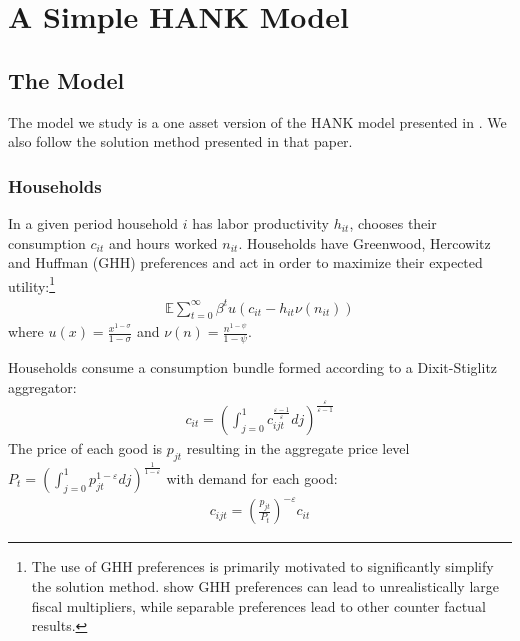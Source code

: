 \documentclass[titlepage]{\econtex}\newcommand{\texname}{ConsumptionHeterogeneity}
\begin{document}
\section{A Simple HANK Model}

\subsection{The Model}
The model we study is a one asset version of the HANK model presented in \cite{blSolving}. We also follow the solution method presented in that paper.

\subsubsection{Households}
In a given period household $i$ has labor productivity $h_{it}$, chooses their consumption $c_{it}$ and hours worked $n_{it}$. Households have Greenwood, Hercowitz and Huffman (GHH) preferences and act in order to maximize their expected utility:\footnote{The use of GHH preferences is primarily motivated to significantly simplify the solution method. \cite{arGHH} show GHH preferences can lead to unrealistically large fiscal multipliers, while separable preferences lead to other counter factual results.}
\begin{align*}
\mathbb{E} \sum_{t=0}^{\infty}\beta^t  u(c_{it} -  h_{it} \nu(n_{it})) 
\end{align*}
where $u(x) = \frac{x^{1-\sigma}}{1-\sigma}$ and $\nu(n) = \frac{n^{1-\psi}}{1-\psi}$.

Households consume a consumption bundle formed according to a Dixit-Stiglitz aggregator:
\begin{align*}
c_{it} = \left(\int_{j=0}^{1} c_{ijt}^{\frac{\varepsilon-1}{\varepsilon}} dj \right)^{\frac{\varepsilon}{\varepsilon-1}}
\end{align*}
The price of each good is $p_{jt}$ resulting in the aggregate price level $P_t = \left(\int_{j=0}^{1} p_{jt}^{1-\varepsilon} dj \right)^{\frac{1}{1-\varepsilon}}$ with demand for each good:
\begin{align*}
c_{ijt} = \left(\frac{p_{jt}}{P_t} \right)^{-\varepsilon} c_{it}
\end{align*}
\end{document}
